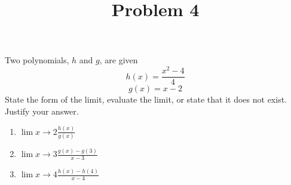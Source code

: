 \documentclass{ximera}
\title[Problem 4]{Problem 4}
\begin{document}
\begin{abstract} \end{abstract}
\maketitle

\begin{problem}
	Two polynomials, $h$ and $g$, are given
	\[ h(x)=\frac{x^2-4}{4} \]
	\[ g(x)=x-2 \]
	 State the form of the limit, evaluate the limit, or state that it does not exist.  Justify your answer.
		
		\begin{enumerate}
		
		\item $\displaystyle \lim{x \to 2}\frac{h(x)}{g(x)}$

\item $\displaystyle \lim{x \to 3}\frac{g(x)-g(3)}{x-3}$
\item  $\displaystyle \lim{x \to4}\frac{h(x)-h(4)}{x-4}$
\end{enumerate}
\end{problem}
\end{document}

